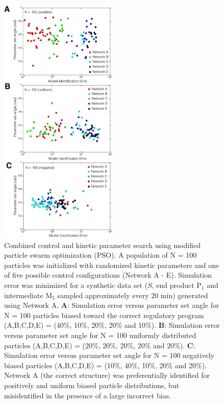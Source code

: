 \documentclass[12pt]{article}
\begin{document}
\begin{figure}
\centering
\includegraphics[width=0.5\textwidth]{./figs/Figure-7-ControlSearch.pdf}
\caption{Combined control and kinetic parameter search using modified particle swarm optimization (PSO). 
A population of N = 100 particles was initialized with randomized kinetic parameters and one of five possible control configurations (Network A - E).
Simulation error was minimized for a synthetic data set 
($S$, end product P$_{1}$ and intermediate M$_5$ sampled approximately every 20 min) generated using Network A.
\textbf{A}: Simulation error versus parameter set angle for N = 100 particles biased toward the correct regulatory program (A,B,C,D,E) = (40\%, 10\%, 20\%, 20\% and 10\%).
\textbf{B}: Simulation error versus parameter set angle for N = 100 uniformly distributed particles (A,B,C,D,E) = (20\%, 20\%, 20\%, 20\% and 20\%).
\textbf{C}: Simulation error versus parameter set angle for N = 100 negatively biased particles (A,B,C,D,E) = (10\%, 40\%, 10\%, 20\% and 20\%).
Network A (the correct structure) was preferentially identified for positively and uniform biased particle distributions, but misidentified in the presence of
a large incorrect bias. 
}\label{fig-control-search}
\end{figure}
\end{document}
